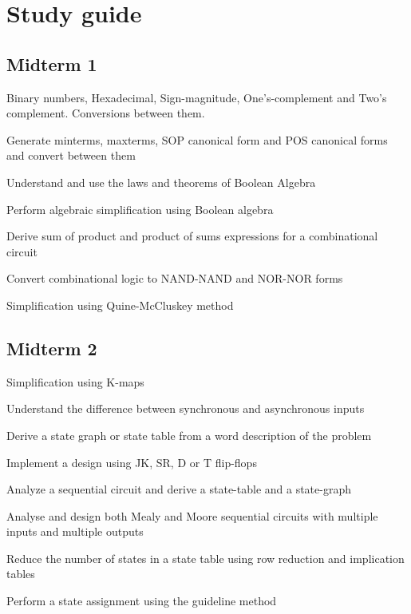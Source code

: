 \documentclass[options]{article}
\newcommand{\cmark}{\ding{51}}%
\newcommand{\done}{\rlap{$\square$}{\raisebox{2pt}{\large\hspace{1pt}\cmark}}%
  \hspace{-2.5pt}}
\begin{document}
\section{Study guide}
\subsection{Midterm 1}
\begin{todolist}
  \item[\done] Binary numbers, Hexadecimal, Sign-magnitude, One's-complement and
    Two's complement. Conversions between them.
  \item[\done] Generate minterms, maxterms, SOP canonical form and POS
    canonical forms and convert between them\\
  \item[\done]  Understand and use the laws and theorems of Boolean Algebra
  \item[\done]  Perform algebraic simplification using Boolean algebra
  \item[\done]  Derive sum of product and product of sums expressions for a combinational circuit
  \item[\done]  Convert combinational logic to NAND-NAND and NOR-NOR forms
  \item[\done]  Simplification using Quine-McCluskey method
\end{todolist}

\subsection{Midterm 2}
\begin{todolist}
  \item[\done] Simplification using K-maps
  \item[\done] Understand the difference between synchronous and asynchronous inputs
  \item[\done] Derive a state graph or state table from a word description of the problem
  \item[\done] Implement a design using JK, SR, D or T flip-flops
  \item[\done] Analyze a sequential circuit and derive a state-table and a state-graph
  \item[\done] Analyse and design both Mealy and Moore sequential circuits with multiple inputs and multiple outputs
  \item[\done] Reduce the number of states in a state table using row reduction and implication tables
  \item[\done] Perform a state assignment using the guideline method
\end{todolist}
\end{document}
